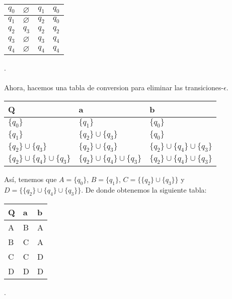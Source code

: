 \documentclass[letterpaper,11pt]{article}
\begin{document}
\begin{enumerate}
\begin{itemize}
\begin{center}
\begin{tabular}{||l | l | l | l||}
     \hline
     $q_0$ & $\varnothing$ & $q_1$ & $q_0$ \\
     \hline
     $q_1$ & $\varnothing$ & $q_2$ & $q_0$ \\
     \hline
     $q_2$ & $q_3$ & $q_2$ & $q_2$\\
     \hline
     $q_3$ & $\varnothing$ & $q_3$ & $q_4$\\
     \hline
     $q_4$ & $\varnothing$ & $q_4$ & $q_4$\\
     \hline
     \end{tabular}
     \end{center}
     .\\ \\
     Ahora, hacemos una tabla de conversion para eliminar las 
     transiciones-$\epsilon$.
     \begin{center}
      \begin{tabular}{||l  | l | l||}
    \hline
    \hline
     Q  & a & b \\
     \hline
     $\{q_0\}$  & $\{q_1\}$ & $\{q_0\}$ \\
     \hline
     $\{q_1\}$ & $\{q_2\} \cup \{q_3\}$ & $\{q_0\}$ \\
     \hline
     $\{q_2\} \cup \{q_3\}$  & $\{q_2\} \cup \{q_3\}$  & 
     $\{q_2\} \cup \{q_4\} \cup \{q_3\}$ \\
     \hline
     $\{q_2\} \cup \{q_4\} \cup \{q_3\}$  & 
     $\{q_2\} \cup \{q_4\} \cup \{q_3\}$ &
     $\{q_2\} \cup \{q_4\} \cup \{q_3\}$ \\
     \hline
     \end{tabular}
     \end{center}
     \newpage
     Así, tenemos que $A = \{q_0\}$, $B = \{q_1\}$, 
     $C = \{ \{q_2\} \cup \{q_3\} \}$ y
     $D = \{ \{q_2\} \cup \{q_4\} \cup \{q_3\} \}$.
     De donde obtenemos la siguiente tabla: \\
     \begin{center}
      \begin{tabular}{||l  | l | l||}
    \hline
    \hline
     Q  & a & b \\
     \hline
     A  & B & A\\
     \hline
     B & C & A\\
     \hline
     C  & C & D\\
     \hline
     D  & D & D\\
     \hline
     \end{tabular}
     \end{center}
     .\\ \\

\end{itemize}
\end{enumerate}
\end{document}
